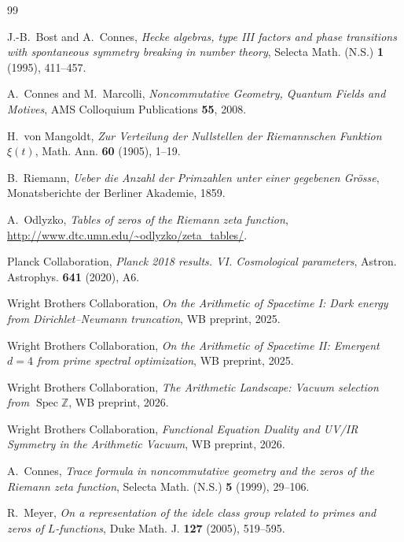 \documentclass[12pt,a4paper]{article}
\newcommand{\Spec}{\operatorname{Spec}}
\begin{document}
\begin{thebibliography}{99}

J.-B.~Bost and A.~Connes,
\emph{Hecke algebras, type III factors and phase transitions with spontaneous symmetry breaking in number theory},
Selecta Math. (N.S.) \textbf{1} (1995), 411--457.

A.~Connes and M.~Marcolli,
\emph{Noncommutative Geometry, Quantum Fields and Motives},
AMS Colloquium Publications \textbf{55}, 2008.

H.~von Mangoldt,
\emph{Zur Verteilung der Nullstellen der Riemannschen Funktion $\xi(t)$},
Math. Ann. \textbf{60} (1905), 1--19.

B.~Riemann,
\emph{Ueber die Anzahl der Primzahlen unter einer gegebenen Gr\"osse},
Monatsberichte der Berliner Akademie, 1859.

A.~Odlyzko,
\emph{Tables of zeros of the Riemann zeta function},
\url{http://www.dtc.umn.edu/~odlyzko/zeta_tables/}.

Planck Collaboration,
\emph{Planck 2018 results. VI. Cosmological parameters},
Astron. Astrophys. \textbf{641} (2020), A6.

Wright Brothers Collaboration,
\emph{On the Arithmetic of Spacetime I: Dark energy from Dirichlet--Neumann truncation},
WB preprint, 2025.

Wright Brothers Collaboration,
\emph{On the Arithmetic of Spacetime II: Emergent $d=4$ from prime spectral optimization},
WB preprint, 2025.

Wright Brothers Collaboration,
\emph{The Arithmetic Landscape: Vacuum selection from $\Spec\mathbb{Z}$},
WB preprint, 2026.

Wright Brothers Collaboration,
\emph{Functional Equation Duality and UV/IR Symmetry in the Arithmetic Vacuum},
WB preprint, 2026.

A.~Connes,
\emph{Trace formula in noncommutative geometry and the zeros of the Riemann zeta function},
Selecta Math. (N.S.) \textbf{5} (1999), 29--106.

R.~Meyer,
\emph{On a representation of the idele class group related to primes and zeros of $L$-functions},
Duke Math. J. \textbf{127} (2005), 519--595.

\end{thebibliography}
\end{document}
